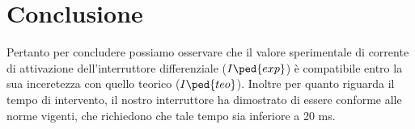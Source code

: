\section*{Conclusione}

Pertanto per concludere possiamo osservare che il valore sperimentale di corrente di attivazione dell'interruttore differenziale ($I\ped{exp}$) è compatibile entro la sua inceretezza con quello teorico ($I\ped{teo}$).
Inoltre per quanto riguarda il tempo di intervento, il nostro interruttore ha dimostrato di essere conforme alle norme vigenti, che 
richiedono che tale tempo sia inferiore a 20 ms.
